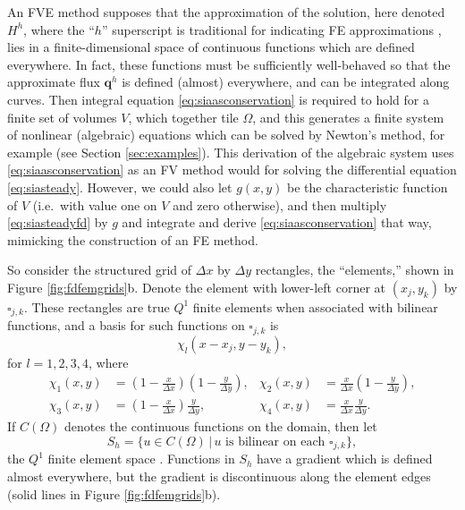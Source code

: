 \documentclass[twocolumn]{igs}
\newcommand\bq{\mathbf{q}}
\begin{document}
An FVE method supposes that the approximation of the solution, here denoted $H^h$, where the ``$h$'' superscript is traditional for indicating FE approximations \cite{Elmanetal2005}, lies in a finite-dimensional space of continuous functions which are defined everywhere.  In fact, these functions must be sufficiently well-behaved so that the approximate flux $\bq^h$ is defined (almost) everywhere, and can be integrated along curves.  Then integral equation \eqref{eq:siaasconservation} is required to hold for a finite set of volumes $V$, which together tile $\Omega$, and this generates a finite system of nonlinear (algebraic) equations which can be solved by Newton's method, for example (see Section \ref{sec:examples}).  This derivation of the algebraic system uses \eqref{eq:siaasconservation} as an FV method would for solving the differential equation \eqref{eq:siasteady}.  However, we could also let $g(x,y)$ be the characteristic function of $V$ (i.e.~with value one on $V$ and zero otherwise), and then multiply \eqref{eq:siasteadyfd} by $g$ and integrate and derive \eqref{eq:siaasconservation} that way, mimicking the construction of an FE method.

So consider the structured grid of $\Delta x$ by $\Delta y$ rectangles, the ``elements,'' shown in Figure \ref{fig:fdfemgrids}b.  Denote the element with lower-left corner at $(x_j,y_k)$ by $\square_{j,k}$.  These rectangles are true $Q^1$ finite elements when associated with bilinear functions, and a basis for such functions on $\square_{j,k}$ is
\begin{equation}
\chi_l(x-x_j,y-y_k), \label{eq:elementbasis}
\end{equation}
for $l=1,2,3,4$, where
\begin{align*}
\chi_1(x,y) &= \left(1-\frac{x}{\Delta x}\right) \left(1-\frac{y}{\Delta y}\right), & \chi_2(x,y) &= \frac{x}{\Delta x} \left(1-\frac{y}{\Delta y}\right), \\
\chi_3(x,y) &= \left(1-\frac{x}{\Delta x}\right) \frac{y}{\Delta y}, & \chi_4(x,y) &= \frac{x}{\Delta x} \frac{y}{\Delta y}. 
\end{align*}
If $C(\Omega)$ denotes the continuous functions on the domain, then let
\begin{equation}
S_h = \{u \in C(\Omega) \,\big|\, u \text{ is bilinear on each $\square_{j,k}$}\},
\end{equation}
the $Q^1$ finite element space \cite{Elmanetal2005}.  Functions in $S_h$ have a gradient which is defined almost everywhere, but the gradient is discontinuous along the element edges (solid lines in Figure \ref{fig:fdfemgrids}b).
\end{document}
